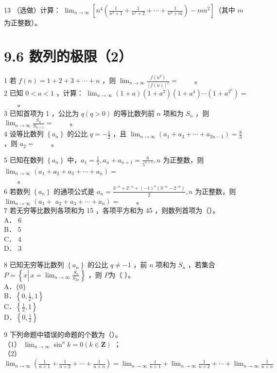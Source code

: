 \documentclass[10pt]{article}
\begin{document}
13 （选做）计算： \(\lim _{n \rightarrow \infty}\left[n^{4}\left(\frac{1}{n^{2}+1}+\frac{1}{n^{2}+2}+\cdots+\frac{1}{n^{2}+m}\right)-m n^{2}\right]\)（其中 \(m\) 为正整数）。

\section*{9.6 数列的极限（2）}
1 若 \(f(n)=1+2+3+\cdots+n\) ，则 \(\lim _{n \rightarrow \infty} \frac{f\left(n^{2}\right)}{[f(n)]^{2}}=\) \(\qquad\)。\\
2 已知 \(0<a<1\) ，计算： \(\lim _{n \rightarrow \infty}(1+a)\left(1+a^{2}\right)\left(1+a^{4}\right) \cdots\left(1+a^{2^{n}}\right)=\) \(\qquad\)。\\
3 已知首项为 1 ，公比为 \(q(q>0)\) 的等比数列前 \(n\) 项和为 \(S_{n}\) ，则 \(\lim _{n \rightarrow \infty} \frac{S_{n}}{S_{n+1}}=\) \(\qquad\)。\\
4 设等比数列 \(\left\{a_{n}\right\}\) 的公比 \(q=-\frac{1}{2}\) ，且 \(\lim _{n \rightarrow \infty}\left(a_{1}+a_{3}+\cdots+a_{2 n-1}\right)=\frac{8}{3}\) ，则 \(a_{2}=\) \(\qquad\)。

5 已知在数列 \(\left\{a_{n}\right\}\) 中，\(a_{1}=\frac{1}{5}, a_{n}+a_{n+1}=\frac{6}{5^{n+1}}, n\) 为正整数，则 \(\lim _{n \rightarrow \infty}\left(a_{1}+a_{2}+a_{3}+\cdots+a_{n}\right)=\)\\
\(\qquad\)。\\
6 若数列 \(\left\{a_{n}\right\}\) 的通项公式是 \(a_{n}=\frac{3^{-n}+2^{-n}+(-1)^{n}\left(3^{-n}-2^{-n}\right)}{2}, n\) 为正整数，则 \(\lim _{n \rightarrow \infty}\left(a_{1}+\right.\) \(\left.a_{2}+a_{3}+\cdots+a_{n}\right)=\) \(\qquad\)。\\
7 若无穷等比数列各项和为 15 ，各项平方和为 45 ，则数列首项为（）。\\
A． 6\\
B． 5\\
C． 4\\
D． 3

8 已知无穷等比数列 \(\left\{a_{n}\right\}\) 的公比 \(q \neq-1\) ，前 \(n\) 项和为 \(S_{n}\) ，若集合 \(P=\left\{x \left\lvert\, x=\lim _{n \rightarrow \infty} \frac{S_{n}}{S_{2 n}}\right.\right\}\) ，则 \(P\)为（ ）。\\
A．\(\{0\}\)\\
B．\(\left\{0, \frac{1}{2}, 1\right\}\)\\
C．\(\left\{\frac{1}{2}, 1\right\}\)\\
D．\(\left\{0, \frac{1}{2}\right\}\)

9 下列命题中错误的命题的个数为（）。\\
（1） \(\lim _{n \rightarrow \infty} \sin ^{n} k=0(k \in \mathbf{Z})\) ；\\
（2） \(\lim _{n \rightarrow \infty}\left(\frac{1}{n+1}+\frac{1}{n+2}+\cdots+\frac{1}{n+n}\right)=\lim _{n \rightarrow \infty} \frac{1}{n+1}+\lim _{n \rightarrow \infty} \frac{1}{n+2}+\cdots+\lim _{n \rightarrow \infty} \frac{1}{n+n}\)
\end{document}
